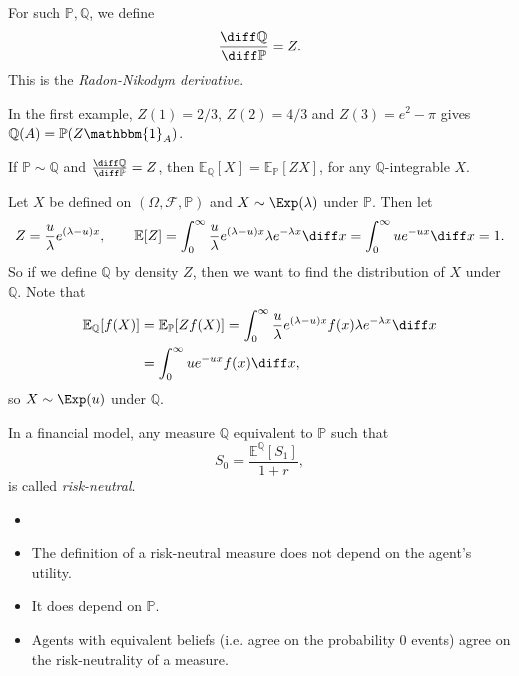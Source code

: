 \documentclass[12pt]{article}
\begin{document}
For such $\mathbb{P}, \mathbb{Q}$, we define
\[
\frac{\diff \mathbb{Q}}{\diff \mathbb{P}} = Z.
\]
This is the \emph{Radon-Nikodym derivative}.

In the first example, $Z(1) = 2/3$, $Z(2) = 4/3$ and $Z(3) = e^2 - \pi$ gives $\mathbb{Q}(A) = \mathbb{P}(Z \mathbbm{1}_{A})$.

\begin{remark}
	If $\mathbb{P} \sim \mathbb{Q}$ and $\frac{\diff \mathbb{Q}}{\diff \mathbb{P}} = Z$, then $\mathbb{E}_{\mathbb{Q}}[X] = \mathbb{E}_{\mathbb{P}}[Z X]$, for any $\mathbb{Q}$-integrable $X$.
\end{remark}

\begin{exbox}
	Let $X$ be defined on $(\Omega, \mathcal{F}, \mathbb{P})$ and $X \sim \Exp(\lambda)$ under $\mathbb{P}$. Then let
	\[
	Z = \frac{u}{\lambda} e^{(\lambda - u)x}, \qquad \mathbb{E}[Z] = \int_0^{\infty} \frac{u}{\lambda} e^{(\lambda - u)x} \lambda e^{-\lambda x} \diff x = \int_0^{\infty} u e^{-u x} \diff x = 1.
	\]
	So if we define $\mathbb{Q}$ by density $Z$, then we want to find the distribution of $X$ under $\mathbb{Q}$. Note that
	\begin{align*}
		\mathbb{E}_{\mathbb{Q}}[f(X)] &= \mathbb{E}_{\mathbb{P}}[Z f(X)] = \int_0^{\infty} \frac{u}{\lambda} e^{(\lambda - u)x} f(x) \lambda e^{-\lambda x} \diff x \\
					      &= \int_0^{\infty} u e^{-u x} f(x) \diff x,
	\end{align*}
	so $X \sim \Exp(u)$ under $\mathbb{Q}$.
\end{exbox}

\begin{definition}
	In a financial model, any measure $\mathbb{Q}$ equivalent to $\mathbb{P}$ such that
	\[
	S_0 = \frac{\mathbb{E}^{\mathbb{Q}}[S_1]}{1 + r},
	\]
	is called \emph{risk-neutral}.
\end{definition}


\begin{remark}
	\begin{itemize}
		\item[]
		\item The definition of a risk-neutral measure does not depend on the agent's utility.
		\item It does depend on $\mathbb{P}$.
		\item Agents with equivalent beliefs (i.e. agree on the probability 0 events) agree on the risk-neutrality of a measure.
	\end{itemize}
\end{remark}
\end{document}
